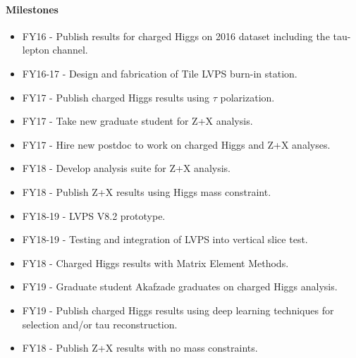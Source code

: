 \paragraph{Milestones}
\begin{itemize}[noitemsep,nolistsep]
\item{FY16 - Publish results for charged Higgs on 2016 dataset including the tau-lepton channel.}
\item{FY16-17 - Design and fabrication of Tile LVPS burn-in station.}
\item{FY17 - Publish charged Higgs results using $\tau$ polarization.}
\item{FY17 - Take new graduate student for Z+X analysis.}
\item{FY17 - Hire new postdoc to work on charged Higgs and Z+X analyses.}
\item{FY18 - Develop analysis suite for Z+X analysis.}
\item{FY18 - Publish Z+X results using Higgs mass constraint.}
\item{FY18-19 - LVPS V8.2 prototype.}
\item{FY18-19 - Testing and integration of LVPS into vertical slice test.}
\item{FY18 - Charged Higgs results with Matrix Element Methods.}
\item{FY19 - Graduate student Akafzade graduates on charged Higgs analysis.}
\item{FY19 - Publish charged Higgs results using deep learning techniques for selection and/or tau reconstruction.}
\item{FY18 - Publish Z+X results with no mass constraints.}
\end{itemize}


